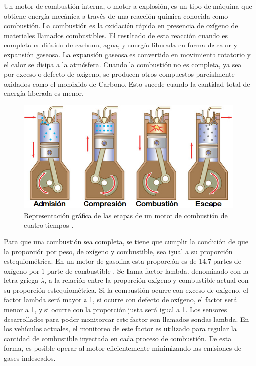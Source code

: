 Un motor de combustión interna, o motor a explosión, es un tipo de máquina que obtiene energía mecánica a través de una reacción química conocida como combustión. La combustión es la oxidación rápida en presencia de oxígeno de materiales llamados combustibles. El resultado de esta reacción cuando es completa es dióxido de carbono, agua, y energía liberada en forma de calor y expansión gaseosa. La expansión gaseosa es convertida en movimiento rotatorio y el calor se disipa a la atmósfera. Cuando la combustión no es completa, ya sea por exceso o defecto de oxígeno, se producen otros compuestos parcialmente oxidados como el monóxido de Carbono. Esto sucede cuando la cantidad total de energía liberada es menor.

\begin{figure}[htpb]
\centering
\includegraphics[width=.9\textwidth]{./Figures/motor-combustion.png}
\caption{Representación gráfica de las etapas de un motor de combustión de cuatro tiempos \protect\footnotemark[2].}
\label{fig:motor-combustion}
\end{figure}

Para que una combustión sea completa, se tiene que cumplir la condición de que la proporción por peso, de oxígeno y combustible, sea igual a su proporción estequiométrica. En un motor de gasolina esta proporción es de 14,7 partes de oxígeno por 1 parte de combustible \citep{book-afr}. Se llama factor lambda, denominado con la letra griega $\lambda$, a la relación entre la proporción oxígeno y combustible actual con su proporción estequiométrica. Si la combustión ocurre con exceso de oxígeno, el factor lambda será mayor a 1, si ocurre con defecto de oxígeno, el factor será menor a 1, y si ocurre con la proporción justa será igual a 1. Los sensores desarrollados para poder monitorear este factor son llamados sondas lambda. En los vehículos actuales, el monitoreo de este factor es utilizado para regular la cantidad de combustible inyectada en cada proceso de combustión. De esta forma, es posible operar al motor eficientemente minimizando las emisiones de gases indeseados.

